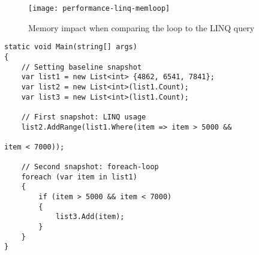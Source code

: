 \begin{figure}[h]
\centering
\texttt{[image: performance-linq-memloop]}
\caption{Memory impact when comparing the loop to the LINQ query}
\label{img:performance-linq-memloop}
\end{figure}

\begin{lstlisting}[label={lst:linq-memory}]
static void Main(string[] args)
{
    // Setting baseline snapshot
    var list1 = new List<int> {4862, 6541, 7841};
    var list2 = new List<int>(list1.Count);
    var list3 = new List<int>(list1.Count);

    // First snapshot: LINQ usage
    list2.AddRange(list1.Where(item => item > 5000 && 
																			 item < 7000));

    // Second snapshot: foreach-loop
    foreach (var item in list1)
    {
        if (item > 5000 && item < 7000)
        {
            list3.Add(item);
        }
    }
}
\end{lstlisting}
